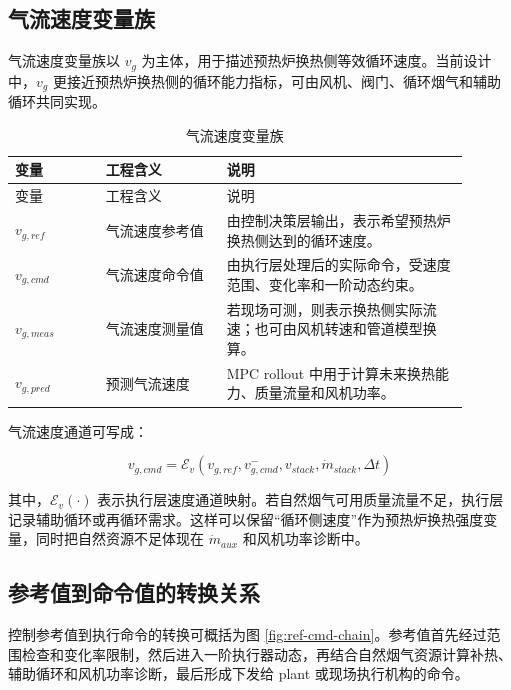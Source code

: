 \documentclass[UTF8,openany,zihao=-4,oneside]{ctexbook}
\begin{document}
\subsection{气流速度变量族}\label{subsec:vg-family}

气流速度变量族以 \(v_g\) 为主体，用于描述预热炉换热侧等效循环速度。当前设计中，\(v_g\) 更接近预热炉换热侧的循环能力指标，可由风机、阀门、循环烟气和辅助循环共同实现。

\begin{longtable}{@{}p{0.18\linewidth}p{0.24\linewidth}p{0.48\linewidth}@{}}
\caption{气流速度变量族}\label{tab:vg-family}\\
\toprule
变量 & 工程含义 & 说明 \\
\midrule
\endfirsthead
\toprule
变量 & 工程含义 & 说明 \\
\midrule
\endhead
\(v_{g,ref}\) & 气流速度参考值 & 由控制决策层输出，表示希望预热炉换热侧达到的循环速度。 \\
\(v_{g,cmd}\) & 气流速度命令值 & 由执行层处理后的实际命令，受速度范围、变化率和一阶动态约束。 \\
\(v_{g,meas}\) & 气流速度测量值 & 若现场可测，则表示换热侧实际流速；也可由风机转速和管道模型换算。 \\
\(v_{g,pred}\) & 预测气流速度 & MPC rollout 中用于计算未来换热能力、质量流量和风机功率。 \\
\bottomrule
\end{longtable}

气流速度通道可写成：

\[
v_{g,cmd}=\mathcal{E}_v\left(v_{g,ref},v_{g,cmd}^{-},v_{stack},\dot m_{stack},\Delta t\right)
\]

其中，\(\mathcal{E}_v(\cdot)\) 表示执行层速度通道映射。若自然烟气可用质量流量不足，执行层记录辅助循环或再循环需求。这样可以保留“循环侧速度”作为预热炉换热强度变量，同时把自然资源不足体现在 \(\dot m_{aux}\) 和风机功率诊断中。

\subsection{参考值到命令值的转换关系}\label{subsec:ref-to-cmd}

控制参考值到执行命令的转换可概括为图 \ref{fig:ref-cmd-chain}。参考值首先经过范围检查和变化率限制，然后进入一阶执行器动态，再结合自然烟气资源计算补热、辅助循环和风机功率诊断，最后形成下发给 plant 或现场执行机构的命令。
\end{document}
